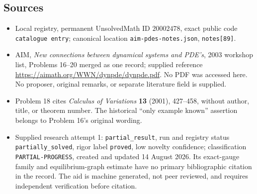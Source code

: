 \documentclass[11pt]{article}
\begin{document}
\subsection{Sources}
\begin{itemize}
\item Local registry, permanent UnsolvedMath ID \(20002478\), exact public code \texttt{catalogue entry}; canonical location \texttt{aim-pdes-notes.json}, \texttt{notes[89]}.
\item AIM, \emph{New connections between dynamical systems and PDE's}, 2003 workshop list, Problems 16--20 merged as one record; supplied reference \url{https://aimath.org/WWN/dynpde/dynpde.pdf}. No PDF was accessed here. No proposer, original remarks, or separate literature field is supplied.
\item Problem 18 cites \emph{Calculus of Variations} \textbf{13} (2001), 427--458, without author, title, or theorem number. The historical ``only example known'' assertion belongs to Problem 16's original wording.
\item Supplied research attempt 1: \texttt{partial\_result}, run and registry status \texttt{partially\_solved}, rigor label \texttt{proved}, low novelty confidence; classification \texttt{PARTIAL-PROGRESS}, created and updated 14 August 2026. Its exact-gauge family and equilibrium-graph estimate have no primary bibliographic citation in the record. The aid is machine generated, not peer reviewed, and requires independent verification before citation.
\end{itemize}
\end{document}
